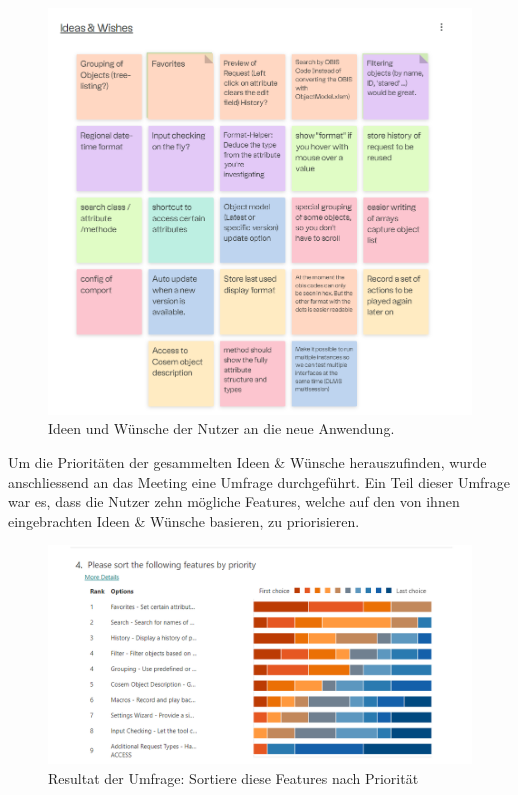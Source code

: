 \begin{figure}[H]
   \centering
   \includegraphics[width=1.0\textwidth]{gfx/S1_RetroBoard_IdeasAndWishes.png}
   \caption{
       Ideen und Wünsche der Nutzer an die neue Anwendung.
   }
   \label{fig:IdeasAndWishes}
\end{figure}

Um die Prioritäten der gesammelten Ideen \& Wünsche herauszufinden, wurde anschliessend an das Meeting eine Umfrage durchgeführt.
Ein Teil dieser Umfrage war es, dass die Nutzer zehn mögliche Features, welche auf den von ihnen eingebrachten Ideen \& Wünsche basieren, zu priorisieren.


\begin{figure}[H]
   \centering
   \includegraphics[width=1.0\textwidth]{gfx/S1_Survey_Prio.png}
   \caption{
       Resultat der Umfrage: Sortiere diese Features nach Priorität
   }
   \label{fig:FeaturesPrio}
\end{figure}

